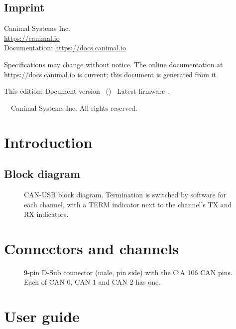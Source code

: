 \documentclass[11pt,letterpaper]{report}
\newcommand\VersionLine{Document version \DocCommit\ (\DocDate) \textperiodcentered\ Latest firmware \FirmwareLatest}
\begin{document}
\vspace{1.5em}
\section*{Imprint}
Canimal Systems Inc.\\
\url{https://canimal.io}\\
Documentation: \url{https://docs.canimal.io}

Specifications may change without notice. The online documentation at
\url{https://docs.canimal.io} is current; this document is generated from it.

This edition: \VersionLine.

\textcopyright\ \DocYear\ Canimal Systems Inc. All rights reserved.

\clearpage
\tableofcontents
{}%

\chapter{Introduction}


\section{Block diagram}
\begin{figure}[H]
  \centering
  
  \caption{CAN-USB block diagram. Termination is switched by software for each channel, with a
    TERM indicator next to the channel's TX and RX indicators.}
\end{figure}

\chapter{Connectors and channels}

\begin{figure}[H]
  \centering
  
  \caption{9-pin D-Sub connector (male, pin side) with the CiA 106 CAN pins. Each of CAN 0,
    CAN 1 and CAN 2 has one.}
\end{figure}

\chapter{User guide}

\end{document}
